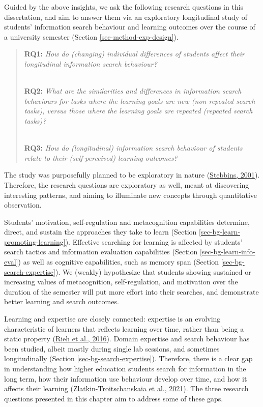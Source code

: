\documentclass[letterpaper, nobind]{templates/ociamthesis}
\begin{document}
Guided by the above insights, we ask the following research questions in this dissertation, and aim to answer them via an exploratory longitudinal study of students' information search behaviour and learning outcomes over the course of a university semester (Section \ref{sec-method-exp-design}).

\begin{quote}
\textbf{RQ1:} \emph{How do (changing) individual differences of students affect their longitudinal information search behaviour?}\\
\strut \\
\textbf{RQ2:} \emph{What are the similarities and differences in information search behaviours for tasks where the learning goals are new (non-repeated search tasks), versus those where the learning goals are repeated (repeated search tasks)?}\\
\strut \\
\textbf{RQ3:} \emph{How do (longitudinal) information search behaviour of students relate to their (self-perceived) learning outcomes?}
\end{quote}

The study was purposefully planned to be exploratory in nature (\protect\hyperlink{ref-stebbins2001exploratory}{Stebbins, 2001}).
Therefore, the research questions are exploratory as well, meant at discovering interesting patterns, and aiming to illuminate new concepts through quantitative observation.

Students' motivation, self-regulation and metacognition capabilities determine, direct, and sustain the approaches they take to learn (Section \ref{sec-bg-learn-promoting-learning}).
Effective searching for learning is affected by students' search tactics and information evaluation capabilities (Section \ref{sec-bg-learn-info-eval}) as well as cognitive capabilities, such as memory span (Section \ref{sec-bg-search-expertise}).
We (weakly) hypothesize that students showing sustained or increasing values of metacognition, self-regulation, and motivation over the duration of the semester will put more effort into their searches, and demonstrate better learning and search outcomes.

Learning and expertise are closely connected: expertise is an evolving characteristic of learners that reflects learning over time, rather than being a static property (\protect\hyperlink{ref-rieh2016searching}{Rieh et al., 2016}).
Domain expertise and search behaviour has been studied, albeit mostly during single lab sessions, and sometimes longitudinally (Section \ref{sec-bg-search-expertise}).
Therefore, there is a clear gap in understanding how higher education students search for information in the long term, how their information use behaviour develop over time, and how it affects their learning (\protect\hyperlink{ref-zlatkin2021students}{Zlatkin-Troitschanskaia et al., 2021}).
The three research questions presented in this chapter aim to address some of these gaps.
\end{document}
